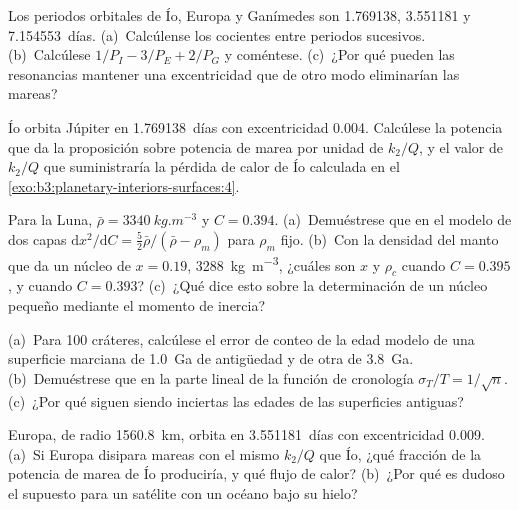\begin{exercise}[$\star\star$]\label{exo:b3:planetary-interiors-surfaces:8}
Los periodos orbitales de Ío, Europa y Ganímedes son 1.769138, 3.551181 y
\num{7.154553}~días. (a)~Calcúlense los cocientes entre periodos sucesivos.
(b)~Calcúlese $1/P_I - 3/P_E + 2/P_G$ y coméntese. (c)~¿Por qué pueden las resonancias
mantener una excentricidad que de otro modo eliminarían las mareas?
\end{exercise}

\begin{exercise}[$\star\star$]\label{exo:b3:planetary-interiors-surfaces:9}
Ío orbita Júpiter en \num{1.769138}~días con excentricidad 0.004.
Calcúlese la potencia que da la proposición sobre potencia de marea por unidad de $k_2/Q$,
y el valor de $k_2/Q$ que suministraría la pérdida de calor de Ío
calculada en el \cref{exo:b3:planetary-interiors-surfaces:4}.
\end{exercise}

\begin{exercise}[$\star\star\star$]\label{exo:b3:planetary-interiors-surfaces:10}
Para la Luna, $\bar\rho = \qty{3340}{kg.m^{-3}}$ y $C = 0.394$.
(a)~Demuéstrese que en el modelo de dos capas $\mathrm dx^2/\mathrm dC =
\tfrac52\bar\rho/(\bar\rho - \rho_m)$ para $\rho_m$ fijo. (b)~Con la
densidad del manto que da un núcleo de $x = 0.19$, \qty{3288}{kg.m^{-3}},
¿cuáles son $x$ y $\rho_c$ cuando $C = 0.395$, y cuando $C = 0.393$?
(c)~¿Qué dice esto sobre la determinación de un núcleo pequeño mediante el momento de
inercia?
\end{exercise}

\begin{exercise}[$\star\star\star$]\label{exo:b3:planetary-interiors-surfaces:11}
(a)~Para 100 cráteres, calcúlese el error de conteo de la edad modelo de una
superficie marciana de \qty{1.0}{Ga} de antigüedad y de otra de \qty{3.8}{Ga}.
(b)~Demuéstrese que en la parte lineal de la función de cronología $\sigma_T/T =
1/\sqrt n$. (c)~¿Por qué siguen siendo inciertas las edades de las superficies antiguas?
\end{exercise}

\begin{exercise}[$\star\star\star$]\label{exo:b3:planetary-interiors-surfaces:12}
Europa, de radio \qty{1560.8}{km}, orbita en \num{3.551181}~días con
excentricidad 0.009. (a)~Si Europa disipara mareas con el mismo $k_2/Q$ que Ío,
¿qué fracción de la potencia de marea de Ío produciría, y qué flujo de calor?
(b)~¿Por qué es dudoso el supuesto para un satélite con un océano bajo su hielo?
\end{exercise}

